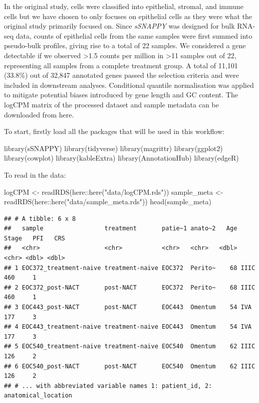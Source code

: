 \documentclass[9pt,a4paper,]{extarticle}
\newenvironment{Shaded}{\begin{snugshade}}{\end{snugshade}}
\newcommand{\FunctionTok}[1]{\textcolor[rgb]{0.00,0.00,0.00}{#1}}
\newcommand{\NormalTok}[1]{#1}
\newcommand{\OtherTok}[1]{\textcolor[rgb]{0.56,0.35,0.01}{#1}}
\newcommand{\SpecialCharTok}[1]{\textcolor[rgb]{0.00,0.00,0.00}{#1}}
\newcommand{\StringTok}[1]{\textcolor[rgb]{0.31,0.60,0.02}{#1}}
\begin{document}
In the original study, cells were classified into epithelial, stromal, and immune cells but we have chosen to only focuses on epithelial cells as they were what the original study primarily focused on. Since \emph{sSNAPPY} was designed for bulk RNA-seq data, counts of epithelial cells from the same samples were first summed into pseudo-bulk profiles, giving rise to a total of 22 samples. We considered a gene detectable if we observed \textgreater1.5 counts per million in \textgreater11 samples out of 22, representing all samples from a complete treatment group. A total of 11,101 (33.8\%) out of 32,847 annotated genes passed the selection criteria and were included in downstream analyses. Conditional quantile normalisation\citep{Hansen2012} was applied to mitigate potential biases introduced by gene length and GC content. The logCPM matrix of the processed dataset and sample metadata can be downloaded from here.

To start, firstly load all the packages that will be used in this workflow:

\begin{Shaded}
\begin{Highlighting}[]
\FunctionTok{library}\NormalTok{(sSNAPPY)}
\FunctionTok{library}\NormalTok{(tidyverse)}
\FunctionTok{library}\NormalTok{(magrittr)}
\FunctionTok{library}\NormalTok{(ggplot2)}
\FunctionTok{library}\NormalTok{(cowplot)}
\FunctionTok{library}\NormalTok{(kableExtra)}
\FunctionTok{library}\NormalTok{(AnnotationHub) }
\FunctionTok{library}\NormalTok{(edgeR)}
\end{Highlighting}
\end{Shaded}

To read in the data:

\begin{Shaded}
\begin{Highlighting}[]
\NormalTok{logCPM }\OtherTok{\textless{}{-}} \FunctionTok{readRDS}\NormalTok{(here}\SpecialCharTok{::}\FunctionTok{here}\NormalTok{(}\StringTok{"data/logCPM.rds"}\NormalTok{))}
\NormalTok{sample\_meta }\OtherTok{\textless{}{-}} \FunctionTok{readRDS}\NormalTok{(here}\SpecialCharTok{::}\FunctionTok{here}\NormalTok{(}\StringTok{"data/sample\_meta.rds"}\NormalTok{))}
\FunctionTok{head}\NormalTok{(sample\_meta)}
\end{Highlighting}
\end{Shaded}

\begin{verbatim}
## # A tibble: 6 x 8
##   sample                 treatment       patie~1 anato~2   Age Stage   PFI   CRS
##   <chr>                  <chr>           <chr>   <chr>   <dbl> <chr> <dbl> <dbl>
## 1 EOC372_treatment-naive treatment-naive EOC372  Perito~    68 IIIC    460     1
## 2 EOC372_post-NACT       post-NACT       EOC372  Perito~    68 IIIC    460     1
## 3 EOC443_post-NACT       post-NACT       EOC443  Omentum    54 IVA     177     3
## 4 EOC443_treatment-naive treatment-naive EOC443  Omentum    54 IVA     177     3
## 5 EOC540_treatment-naive treatment-naive EOC540  Omentum    62 IIIC    126     2
## 6 EOC540_post-NACT       post-NACT       EOC540  Omentum    62 IIIC    126     2
## # ... with abbreviated variable names 1: patient_id, 2: anatomical_location
\end{verbatim}
\end{document}
